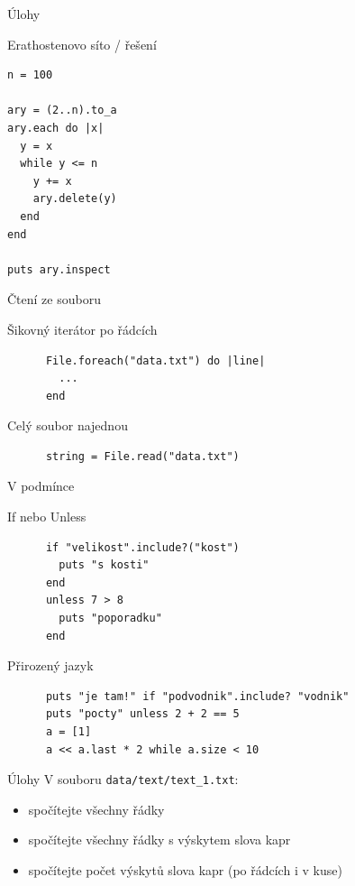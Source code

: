 \documentclass{beamer}
\begin{document}
\begin{frame}[fragile]{Úlohy}
  \begin{block}{Erathostenovo síto / řešení}
\begin{verbatim}
n = 100

ary = (2..n).to_a
ary.each do |x|
  y = x
  while y <= n
    y += x
    ary.delete(y)
  end
end

puts ary.inspect
\end{verbatim}
  \end{block}
\end{frame}

\begin{frame}[fragile]{Čtení ze souboru}
  \begin{block}{Šikovný iterátor po řádcích}
    \begin{verbatim}
      File.foreach("data.txt") do |line|
        ...
      end
    \end{verbatim}
  \end{block}
  \pause
  \begin{block}{Celý soubor najednou}
    \begin{verbatim}
      string = File.read("data.txt")
    \end{verbatim}
  \end{block}
\end{frame}

\begin{frame}[fragile]{V podmínce}
  \begin{block}{If nebo Unless}
    \scriptsize
    \begin{verbatim}
      if "velikost".include?("kost")
        puts "s kosti"
      end
      unless 7 > 8
        puts "poporadku"
      end
    \end{verbatim}
  \end{block}
  \pause
  \begin{block}{Přirozený jazyk}
    \scriptsize
    \begin{verbatim}
      puts "je tam!" if "podvodnik".include? "vodnik"
      puts "pocty" unless 2 + 2 == 5
      a = [1]
      a << a.last * 2 while a.size < 10
    \end{verbatim}
  \end{block}
\end{frame}

\begin{frame}{Úlohy}
  V souboru \texttt{data/text/text\_1.txt}:
  \begin{itemize}
    \item spočítejte všechny řádky
    \item spočítejte všechny řádky s výskytem slova kapr
    \item spočítejte počet výskytů slova kapr (po řádcích i v kuse)
  \end{itemize}
\end{frame}
\end{document}
